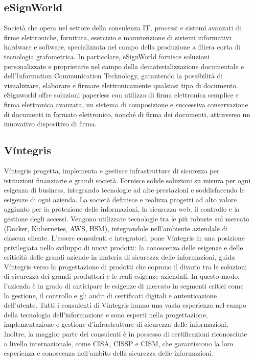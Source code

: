 \subsection{eSignWorld}
Società che opera nel settore della consulenza IT, processi e sistemi avanzati di firme elettroniche,
fornitura, esercizio e manutenzione di sistemi informativi hardware e software, specializzata nel
campo della produzione a filiera corta di tecnologia grafometrica. In particolare, eSignWorld
fornisce soluzioni personalizzate e proprietarie nel campo della dematerializzazione documentale
e dell'Information Communication Technology, garantendo la possibilità di visualizzare,
elaborare e firmare elettronicamente qualsiasi tipo di documento. eSignworld offre soluzioni
paperless con utilizzo di firma elettronica semplice e firma elettronica avanzata, un sistema di
composizione e successiva conservazione di documenti in formato elettronico, nonché di firma dei
documenti, attraverso un innovativo dispositivo di firma.
\subsection{Víntegris}
Víntegris progetta, implementa e gestisce infrastrutture di sicurezza per istituzioni finanziarie
e grandi società. Fornisce solide soluzioni su misura per ogni esigenza di business, integrando
tecnologie ad alte prestazioni e soddisfacendo le esigenze di ogni azienda. La società definisce e
realizza progetti ad alto valore aggiunto per la protezione delle informazioni, la sicurezza web, il
controllo e la gestione degli accessi. Vengono utilizzate tecnologie tra le più robuste sul mercato
(Docker, Kubernetes, AWS, HSM), integrandole nell'ambiente aziendale di ciascun cliente. L'essere consulenti e integratori, pone Víntegris in una posizione privilegiata nello sviluppo di nuovi
prodotti: la conoscenza delle esigenze e delle criticità delle grandi aziende in materia di sicurezza
delle informazioni, guida Víntegris verso la progettazione di prodotti che coprono il divario tra le
soluzioni di sicurezza dei grandi produttori e le reali esigenze aziendali. In questo modo, l'azienda
è in grado di anticipare le esigenze di mercato in segmenti critici come la gestione, il controllo e
gli audit di certificati digitali e autenticazione dell'utente. Tutti i consulenti di Víntegris hanno
una vasta esperienza nel campo della tecnologia dell'informazione e sono esperti nella progettazione, implementazione e gestione d'infrastrutture di sicurezza delle informazioni. Inoltre, la
maggior parte dei consulenti è in possesso di certificazioni riconosciute a livello internazionale,
come CISA, CISSP e CISM, che garantiscono la loro esperienza e conoscenza nell'ambito della
sicurezza delle informazioni.

